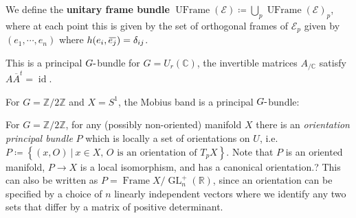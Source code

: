 \begin{definition}

We define the \textbf{unitary frame bundle}
\({\operatorname{UFrame}}(\mathcal{E}) \coloneqq\bigcup_p {\operatorname{UFrame}}(\mathcal{E})_p\),
where at each point this is given by the set of orthogonal frames of
\(\mathcal{E}_p\) given by \((e_1, \cdots, e_n)\) where
\(h(e_i , \mkern 1.5mu\overline{\mkern-1.5mue_j\mkern-1.5mu}\mkern 1.5mu ) = \delta_{ij}\).

\end{definition}

\begin{remark}

This is a principal \(G{\hbox{-}}\)bundle for \(G = U_r({\mathbb{C}})\),
the invertible matrices \(A_{/{\mathbb{C}}}\) satisfy
\(A \overline{A}^t = \operatorname{id}\).

\end{remark}

\begin{example}

For \(G={\mathbb{Z}}/2{\mathbb{Z}}\) and \(X= S^1\), the Mobius band is
a principal \(G{\hbox{-}}\)bundle:

\begin{figure}
\centering
{}
\end{figure}

\end{example}

\begin{example}

For \(G={\mathbb{Z}}/2{\mathbb{Z}}\), for any (possibly non-oriented)
manifold \(X\) there is an \emph{orientation principal bundle} \(P\)
which is locally a set of orientations on \(U\),
i.e.~\(P\coloneqq\left\{{(x, O) {~\mathrel{\Big|}~}x\in X,\, O \text{ is an orientation of }T_p X}\right\}\).
Note that \(P\) is an oriented manifold, \(P\to X\) is a local
isomorphism, and has a canonical orientation.? This can also be written
as
\(P = {\operatorname{Frame}}X / \operatorname{GL}_n^+({\mathbb{R}})\),
since an orientation can be specified by a choice of \(n\) linearly
independent vectors where we identify any two sets that differ by a
matrix of positive determinant.

\end{example}


